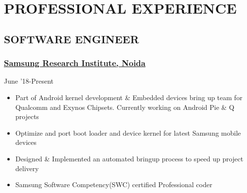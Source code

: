 \documentclass[letterpaper]{twentysecondcv} %
\begin{document}




\makeprofile %



\section{PROFESSIONAL EXPERIENCE}
\subsection{SOFTWARE ENGINEER}\subsubsection{\href{https://research.samsung.com/sri-n}{Samsung Research Institute, Noida}}  \hfill{} June '18-Present
\begin{itemize}
    \item Part of Android kernel development \& Embedded devices bring up team for Qualcomm and Exynos Chipsets. Currently working on Android Pie \& Q projects
    \item Optimize and port boot loader and device kernel for latest Samsung mobile devices
    \item Designed \& Implemented an automated bringup process to speed up project delivery
    \item Samsung Software Competency(SWC) certified Professional coder
\end{itemize}
\end{document}

